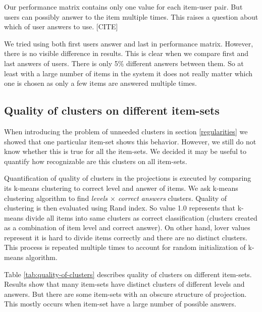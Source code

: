 \documentclass[
  digital, %
  table,   %
  nolof,     %
  nolot,     %
  nocover,
  color
]{fithesis3}
\begin{document}

Our performance matrix contains only one value for each item-user pair. But users can possibly answer to the item multiple times. This raises a question about which of user answers to use. [CITE]


We tried using both first users answer and last in performance matrix. However, there is no visible difference in results. This is clear when we compare first and last answers of users. There is only 5\% different answers between them. So at least with a large number of items in the system it does not really matter which one is chosen as only a few items are answered multiple times.

\subsection{Quality of clusters on different item-sets}\label{quality-of-clusters}

When introducing the problem of unneeded clusters in section \ref{regularities} we showed that one particular item-set shows this behavior. However, we still do not know whether this is true for all the item-sets. We decided it may be useful to quantify how recognizable are this clusters on all item-sets.


Quantification of quality of clusters in the projections is executed by comparing its k-means clustering to correct level and answer of items. We ask k-means clustering algorithm to find \textit{levels $\times$ correct answers} clusters. Quality of clustering is then evaluated using Rand index. So value 1.0 represents that k-means divide all items into same clusters as correct classification (clusters created as a combination of item level and correct answer). On other hand, lover values represent it is hard to divide items correctly and there are no distinct clusters. This process is repeated multiple times to account for random initialization of k-means algorithm.

Table \ref{tab:quality-of-clusters} describes quality of clusters on different item-sets. Results show that many item-sets have distinct clusters of different levels and answers. But there are some item-sets with an obscure structure of projection. This mostly occurs when item-set have a large number of possible answers.
\end{document}
